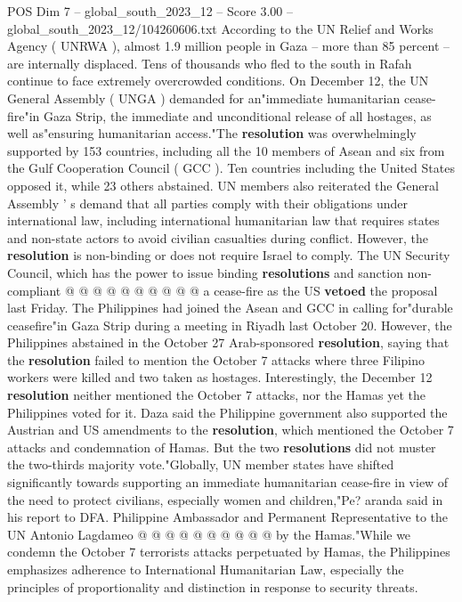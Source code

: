 \begin{textsample}{POS Dim 7 – global\_south\_2023\_12 – Score 3.00 – global\_south\_2023\_12/104260606.txt}  \label{ex:f7_pos_033}
According to the UN Relief and Works Agency ( UNRWA ), almost 1.9 million people in Gaza -- more than 85 percent -- are internally displaced.
Tens of thousands who fled to the south in Rafah continue to face extremely overcrowded conditions.
On December 12, the UN General Assembly ( UNGA ) demanded for an"immediate humanitarian cease-fire"in Gaza Strip, the immediate and unconditional release of all hostages, as well as"ensuring humanitarian access."The \textbf{resolution} was overwhelmingly supported by 153 countries, including all the 10 members of Asean and six from the Gulf Cooperation Council ( GCC ).
Ten countries including the United States opposed it, while 23 others abstained.
UN members also reiterated the General Assembly ' s demand that all parties comply with their obligations under international law, including international humanitarian law that requires states and non-state actors to avoid civilian casualties during conflict.
However, the \textbf{resolution} is non-binding or does not require Israel to comply.
The UN Security Council, which has the power to issue binding \textbf{resolutions} and sanction non-compliant @ @ @ @ @ @ @ @ @ @ a cease-fire as the US \textbf{vetoed} the proposal last Friday.
The Philippines had joined the Asean and GCC in calling for"durable ceasefire"in Gaza Strip during a meeting in Riyadh last October 20.
However, the Philippines abstained in the October 27 Arab-sponsored \textbf{resolution}, saying that the \textbf{resolution} failed to mention the October 7 attacks where three Filipino workers were killed and two taken as hostages.
Interestingly, the December 12 \textbf{resolution} neither mentioned the October 7 attacks, nor the Hamas yet the Philippines voted for it.
Daza said the Philippine government also supported the Austrian and US amendments to the \textbf{resolution}, which mentioned the October 7 attacks and condemnation of Hamas.
But the two \textbf{resolutions} did not muster the two-thirds majority vote."Globally, UN member states have shifted significantly towards supporting an immediate humanitarian cease-fire in view of the need to protect civilians, especially women and children,"Pe? aranda said in his report to DFA.
Philippine Ambassador and Permanent Representative to the UN Antonio Lagdameo @ @ @ @ @ @ @ @ @ @ by the Hamas."While we condemn the October 7 terrorists attacks perpetuated by Hamas, the Philippines emphasizes adherence to International Humanitarian Law, especially the principles of proportionality and distinction in response to security threats.

\end{textsample}
